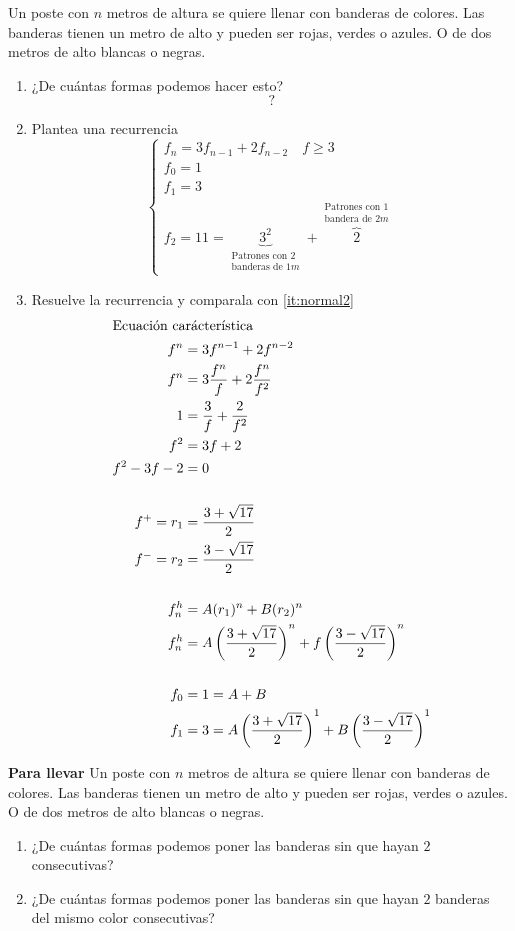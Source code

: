 \documentclass[../main.tex]{subfiles}
\begin{document}
Un poste con $n$ metros de altura se quiere llenar con banderas de colores.
Las banderas tienen un metro de alto y pueden ser rojas, verdes o azules.
O de dos metros de alto blancas o negras.
\begin{enumerate}
	\item\label{it:normal2} ¿De cuántas formas podemos hacer esto?
		\[
			?
		\]
	\item Plantea una recurrencia
		\[
			\begin{cases}
				f_n = 3f_{n-1}+ 2f_{n-2} \quad f \geq 3\\
				f_0 = 1\\
				f_1 = 3\\
				f_2 = 11 =
				\underbrace
				{
					3^2
				}_
				{
					\substack
					{
						\text{Patrones con $2$}\\
						\text{banderas de $1m$}
					}
				}
				+
				\overbrace
				{
					2
				}^
				{
					\substack
					{
						\text{Patrones con $1$}\\
						\text{bandera de $2m$}
					}
				}
			\end{cases}
		\]
	\item Resuelve la recurrencia y comparala con \ref{it:normal2}
		\begin{align*}
			\intertext{Ecuación carácterística}
			f^n &= 3f^{n-1}+2f^{n-2}\\
			f^n &= 3 \frac{f^n}{f} +2 \frac{f^n}{f^2}\\
			1 &= \frac{3}{f} + \frac{2}{f^2}\\
			f^2 &= 3f + 2\\
			f^2 - 3f - 2 &= 0\\
			\\
			f^+ = r_1 &= \frac{3+\sqrt{17}}{2} \\
			f^- = r_2 &= \frac{3-\sqrt{17}}{2}\\
			\\
			f_n^h &= A(r_1)^n + B(r_2)^n\\
			f_n^h &=
			A\left(
				\frac{3+\sqrt{17}}{2}
			\right)^n
			+
			f\left(
				\frac{3-\sqrt{17}}{2}
			\right)^n\\
			\\
			f_0 &= 1 = A + B\\
			f_1 &= 3 =
			A
			\left(
			\frac{3+\sqrt{17}}{2}
			\right)^1
			+
			B
			\left(
			\frac{3-\sqrt{17}}{2}
			\right)^1
		\end{align*}
\end{enumerate}
\textbf{Para llevar}
Un poste con $n$ metros de altura se quiere llenar con banderas de colores.
Las banderas tienen un metro de alto y pueden ser rojas, verdes o azules.
O de dos metros de alto blancas o negras.
\begin{enumerate}
	\item ¿De cuántas formas podemos poner las banderas sin que hayan
		$2$ consecutivas?
	\item ¿De cuántas formas podemos poner las banderas sin que hayan
		$2$ banderas del mismo color consecutivas?
\end{enumerate}
\end{document}
